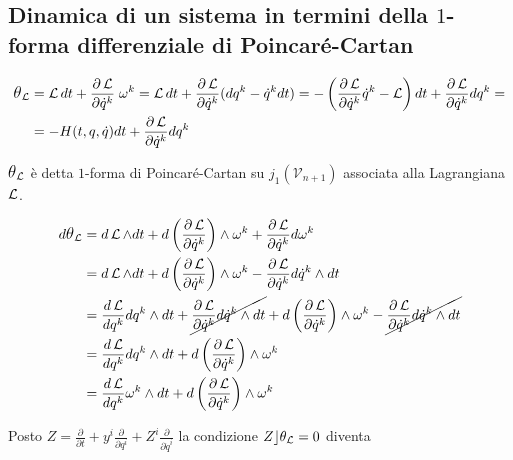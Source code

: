 \subsection{Dinamica di un sistema in termini della $ 1 $-forma differenziale di Poincaré-Cartan}

\begin{equation*}
\begin{split}
\text{\large$\theta$}_{\operatorname{\mathcal{L}}} &= \operatorname{\mathcal{L}} dt + \frac{\partial \operatorname{\mathcal{L}}}{\partial \dot{q}^k}\;\omega ^k = \operatorname{\mathcal{L}} dt + \frac{\partial \operatorname{\mathcal{L}}}{\partial \dot{q}^k}(dq^k-\dot{q}^k dt)= -\left(\frac{\partial \operatorname{\mathcal{L}}}{\partial \dot{q}^k} \dot{q}^k - \operatorname{\mathcal{L}} \right)dt + \frac{\partial \operatorname{\mathcal{L}}}{\partial \dot{q}^k} dq^k=\\ &= -H(t,q,\dot{q})dt + \frac{\partial \operatorname{\mathcal{L}}}{\partial \dot{q}^k} dq^k
\end{split}
\end{equation*}

\hspace*{-0.11 cm}$\text{\large$\theta$}_{\operatorname{\mathcal{L}}}$ è detta $ 1 $-forma di Poincaré-Cartan su $ j_1 (\mathcal{V}_{n+1}) $ associata alla Lagrangiana $ \operatorname{\mathcal{L}} $.

\begin{equation*}
\begin{split}
d\text{\large$\theta$}_{\operatorname{\mathcal{L}}} &= d\operatorname{\mathcal{L}} \wedge dt + d \left(\frac{\partial \operatorname{\mathcal{L}}}{\partial \dot{q}^k}\right) \wedge \omega ^k + \frac{\partial \operatorname{\mathcal{L}}}{\partial \dot{q}^k} d \omega ^k\\
&= d\operatorname{\mathcal{L}} \wedge dt + d \left(\frac{\partial \operatorname{\mathcal{L}}}{\partial \dot{q}^k}\right) \wedge \omega ^k - \frac{\partial \operatorname{\mathcal{L}}}{\partial \dot{q}^k} d \dot{q}^k \wedge dt\\
&= \frac{d \operatorname{\mathcal{L}}}{dq^k} dq^k \wedge dt + \cancel{\frac{\partial \operatorname{\mathcal{L}}}{\partial \dot{q}^k} d \dot{q}^k \wedge dt} + d \left(\frac{\partial \operatorname{\mathcal{L}}}{\partial \dot{q}^k}\right) \wedge \omega ^k - \cancel{\frac{\partial \operatorname{\mathcal{L}}}{\partial \dot{q}^k} d \dot{q}^k \wedge dt}\\
&= \frac{d \operatorname{\mathcal{L}}}{dq^k} dq^k \wedge dt + d \left(\frac{\partial \operatorname{\mathcal{L}}}{\partial \dot{q}^k}\right) \wedge \omega ^k\\
&= \frac{d \operatorname{\mathcal{L}}}{dq^k} \omega ^k \wedge dt + d \left(\frac{\partial \operatorname{\mathcal{L}}}{\partial \dot{q}^k}\right) \wedge \omega ^k
\end{split}
\end{equation*}

Posto $ Z = \frac{\partial}{\partial t} + y^i \frac{\partial}{\partial q^i} + Z^i \frac{\partial}{\partial \dot{q}^i} $ la condizione $ Z \rfloor \theta_{\operatorname{\mathcal{L}}} = 0 $ diventa

